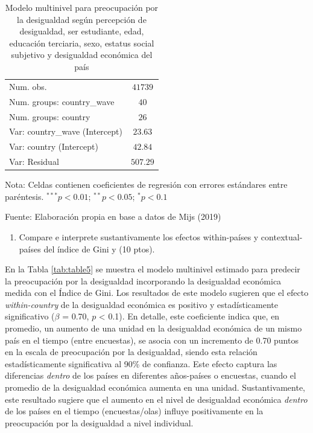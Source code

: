 \documentclass[
  12pt,
  a4paper,
]{article}
\providecommand{\tightlist}{%
  \setlength{\itemsep}{0pt}\setlength{\parskip}{0pt}}
\begin{document}
\begin{table}[H]
\begin{center}
{\begin{threeparttable}
\begin{tabular}{l c}
Num. obs.                                           & $41739$       \\
Num. groups: country\_wave                          & $40$          \\
Num. groups: country                                & $26$          \\
Var: country\_wave (Intercept)                      & $23.63$       \\
Var: country (Intercept)                            & $42.84$       \\
Var: Residual                                       & $507.29$      \\
\bottomrule
\end{tabular}
\begin{tablenotes}[flushleft]
\scriptsize{\item Nota: Celdas contienen coeficientes de regresión con errores estándares entre paréntesis. $^{***}p<0.01$; $^{**}p<0.05$; $^{*}p<0.1$ \\ \item Fuente: Elaboración propia en base a datos de Mijs (2019)}
\end{tablenotes}
\end{threeparttable}
}
\caption{\label{tab:table5} Modelo multinivel para preocupación por la desigualdad según percepción de desigualdad, ser estudiante, edad, educación terciaria, sexo, estatus social subjetivo y desigualdad económica del país}
\label{table:coefficients}
\end{center}
\end{table}

\begin{enumerate}
\def\labelenumi{\alph{enumi})}
\setcounter{enumi}{1}
\tightlist
\item
  Compare e interprete sustantivamente los efectos within-países y contextual-países del índice de Gini y (10 ptos).
\end{enumerate}

En la Tabla \ref{tab:table5} se muestra el modelo multinivel estimado para predecir la preocupación por la desigualdad incorporando la desigualdad económica medida con el Índice de Gini. Los resultados de este modelo sugieren que el efecto \emph{within-country} de la desigualdad económica es positivo y estadísticamente significativo (\(\beta\) = 0.70, \(p\) \textless{} 0.1). En detalle, este coeficiente indica que, en promedio, un aumento de una unidad en la desigualdad económica de un mismo país en el tiempo (entre encuestas), se asocia con un incremento de 0.70 puntos en la escala de preocupación por la desigualdad, siendo esta relación estadísticamente significativa al 90\% de confianza. Este efecto captura las diferencias \emph{dentro} de los países en diferentes años-países o encuestas, cuando el promedio de la desigualdad económica aumenta en una unidad. Sustantivamente, este resultado sugiere que el aumento en el nivel de desigualdad económica \emph{dentro} de los países en el tiempo (encuestas/olas) influye positivamente en la preocupación por la desigualdad a nivel individual.
\end{document}
